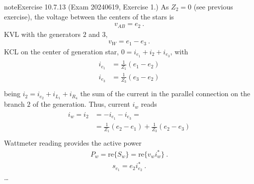 \documentclass[letterpaper,10pt,italian]{jupyterBook}
\begin{document}
\begin{sphinxadmonition}{note}{Exercise 10.7.13 (Exam 2024\sphinxhyphen{}06\sphinxhyphen{}19, Exercise 1.)}
\sphinxAtStartPar
{} As \(Z_2 = 0\) (see previous exercise), the voltage between the centers of the stars is
\begin{equation*}
\begin{split}v_{AB} = e_2 \ .\end{split}
\end{equation*}
\sphinxAtStartPar
{} KVL with the generators \(2\) and \(3\),
\begin{equation*}
\begin{split}v_W = e_1 - e_3 \ .\end{split}
\end{equation*}
\sphinxAtStartPar
{} KCL on the center of generation star, \(0 = i_{e_1} + i_{2} + i_{e_3}\), with
\begin{equation*}
\begin{split}\begin{aligned}
  i_{e_1} & =  \frac{1}{Z_1} ( e_1 - e_2 ) \\
  i_{e_3} & =  \frac{1}{Z_3} ( e_3 - e_2 ) \\
\end{aligned}\end{split}
\end{equation*}
\sphinxAtStartPar
being \(i_2 = i_{e_2} + i_{L_1} + i_{R_4}\) the sum of the current in the parallel connection on the branch \(2\) of the generation. Thus, current \(i_{w}\) reads
\begin{equation*}
\begin{split}\begin{aligned}
  i_w = i_{2} 
  & = - i_{e_1} - i_{e_3} = \\
  & = \frac{1}{Z_1} ( e_2 - e_1 ) + \frac{1}{Z_3} ( e_2 - e_3 ) \\
\end{aligned}\end{split}
\end{equation*}
\sphinxAtStartPar
{} Wattmeter reading provides the active power
\begin{equation*}
\begin{split}P_w = \text{re} \{ S_w \} = \text{re} \{ v_w i_w^* \} \ .\end{split}
\end{equation*}
\sphinxAtStartPar
{}
\begin{equation*}
\begin{split}s_{e_1} = e_{2} i_{e_2}^* \ .\end{split}
\end{equation*}
\sphinxAtStartPar
…
\end{sphinxadmonition}
 \label{exercise:exam-24-02-13-exe-02}
\end{document}
